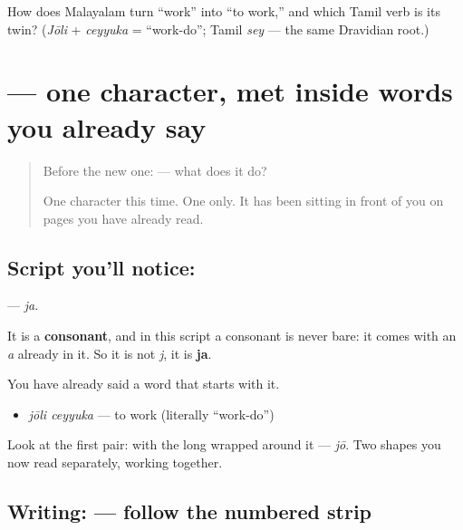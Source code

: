 \begin{tcolorbox}[breakable,colback=teal!4,colframe=teal!35!black,title={Before you move on}]
How does Malayalam turn \textquotedblleft{}work\textquotedblright{} into \textquotedblleft{}to work,\textquotedblright{} and which Tamil verb is its twin? (\emph{Jōli} + \emph{ceyyuka} = \textquotedblleft{}work-do\textquotedblright{}; Tamil \emph{sey} — the same Dravidian root.)
\end{tcolorbox}
\section[\texorpdfstring{\ml{ജ} (ja)}{ജ (ja)}]{ — one character, met inside words you already say}

\label{lesson:ML-S145-letter-ja}



\begin{quote}
Before the new one:  — what does it do?

One character this time. One only. It has been sitting in front of you on pages you have already read.
\end{quote}

\subsection*{Script you'll notice: }
\textbf{} — \emph{ja}.

It is a \textbf{consonant}, and in this script a consonant is never bare: it comes with an \emph{a} already in it. So it is not \emph{j}, it is \textbf{ja}.

You have already said a word that starts with it.

\begin{itemize}
\raggedright
  \item \textbf{ } \emph{jōli ceyyuka} — to work (literally \textquotedblleft{}work-do\textquotedblright{})
\end{itemize}

Look at the first pair: \textbf{} with the long \textbf{} wrapped around it — \emph{jō}. Two shapes you now read separately, working together.

\subsection*{Writing:  — follow the numbered strip}

